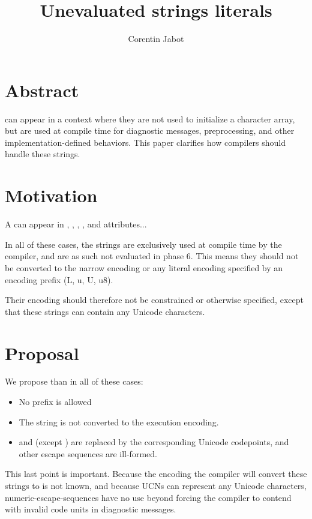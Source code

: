 \documentclass{wg21}
\title{Unevaluated strings literals}
\author{Corentin Jabot}{corentin.jabot@gmail.com}
\begin{document}
\maketitle

\section{Abstract}

 can appear in a context where they are not used to
initialize a character array, but are used at compile time for diagnostic messages,
preprocessing, and other implementation-defined behaviors.
This paper clarifies how compilers should handle these strings.


\section{Motivation}

A  can appear in , , ,
, \tcode{[[deprecated]]} and \tcode{[[nodiscard]]} attributes...

In all of these cases, the strings are exclusively used at compile time by the compiler, and are as such not evaluated in phase 6.
This means they should not be converted to the narrow encoding or any literal encoding specified by an encoding prefix (L, u, U, u8).

Their encoding should therefore not be constrained or otherwise specified,
except that these strings can contain any Unicode characters.

\section{Proposal}

We propose than in all of these cases:
\begin{itemize}
\item No prefix is allowed
\item The string is not converted to the execution encoding.
\item {} and  (except  ) are replaced by
the corresponding Unicode codepoints, and other escape sequences are ill-formed.
\end{itemize}

This last point is important. Because the encoding the compiler will convert these strings to is not known, and because UCNs can represent any Unicode characters,
numeric-escape-sequences have no use beyond forcing the compiler to contend with invalid
code units in diagnostic messages.
\end{document}
